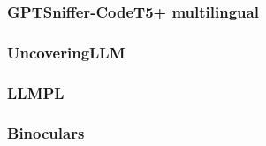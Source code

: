 \subsubsection{GPTSniffer-CodeT5+ multilingual}



\subsubsection{UncoveringLLM}




\subsubsection{LLMPL}



\subsubsection{Binoculars}